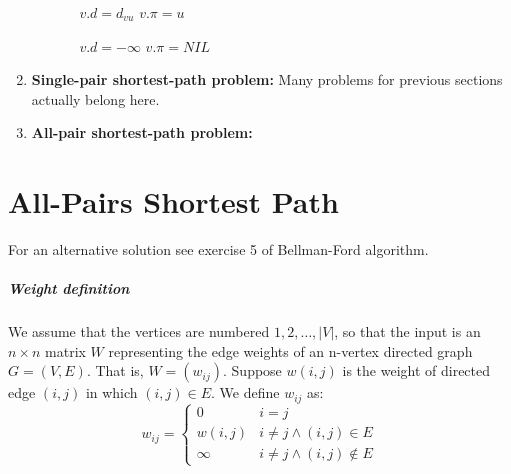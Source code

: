 \documentclass{book}
\begin{document}
\begin{enumerate}
\begin{enumerate}
\begin{itemize}
\begin{algorithm}[h!]
				\begin{algorithmic}[1]
							\State $v.d = d_{vu}$
							\State $v.\pi = u$
						\EndIf
					\EndFunction
				\end{algorithmic}
			\end{algorithm}
			\begin{algorithm}[h!]
				\begin{algorithmic}
							\State $v.d = -\infty$
							\State $v.\pi = NIL$
						\EndFor
					\EndFunction
				\end{algorithmic}
			\end{algorithm}
			\FloatBarrier			
		\end{itemize}
	\end{enumerate}
	\item \textbf{Single-pair shortest-path problem:}
	Many problems for previous sections actually belong here.
	\item \textbf{All-pair shortest-path problem:}
	\end{enumerate}
	
	\chapter{All-Pairs Shortest Path}
	For an alternative solution see exercise 5 of Bellman-Ford algorithm.
	\paragraph{Weight definition} We assume that the vertices are numbered $1, 2, \dots, |V|$, so that the input is an $n \times n$ matrix $W$ representing the edge weights of an n-vertex directed graph $G = (V, E)$. That is, $W = (w_{ij})$. Suppose $w(i, j)$ is the weight of directed edge $(i, j)$ in which $(i, j) \in E$. We define $w_{ij}$ as:
	\begin{equation*}
		w_{ij} = \begin{cases}
			0 & i = j \\
			w(i, j) & i \ne j \land (i, j) \in E \\
			\infty & i \ne j \land (i, j) \notin E
		\end{cases}
	\end{equation*}
\end{document}
